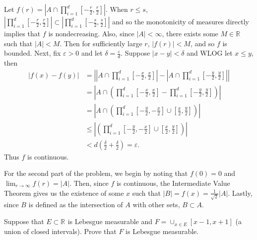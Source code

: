\begin{solution}
  Let $f(r) = \left| A \cap \prod_{i=1}^{d } [-\frac{r}{2}, \frac{r}{2}] \right|$.
  When $r\leq s$, $\left| \prod_{i=1}^{d } [-\frac{r}{2}, \frac{r}{2}] \right| \subset \left| \prod_{i=1}^{d } [-\frac{s}{2}, \frac{s}{2}] \right|$ and so the monotonicity of measures directly implies that $f$ is nondecreasing.
  Also, since $\left| A \right| < \infty$, there exists some $M \in \mathbb{R}^{}$ such that $\left| A \right| < M$.
  Then for sufficiently large $r$, $\left| f(r) \right| < M$, and so $f$ is bounded.
  Next, fix $\varepsilon > 0$ and let $\delta = \frac{\varepsilon}{d}$.
  Suppose $\left| x - y \right| < \delta$ and WLOG let $x \leq  y$, then
    \begin{align*}
      \left| f(x) - f(y) \right| &= \left| \left| A \cap \prod_{i=1}^{d } [-\frac{x}{2}, \frac{x}{2}] \right| - \left| A \cap \prod_{i=1}^{d } [-\frac{y}{2}, \frac{y}{2}] \right| \right| \\
                                 &= \left| A \cap \left( \prod_{i=1}^{d } [-\frac{x}{2}, \frac{x}{2}] - \prod_{i=1}^{d } [-\frac{y}{2}, \frac{y}{2}] \right) \right| \tag{Class Corollary}\\
                                 &= \left| A \cap \left( \prod_{i=1}^{d } [-\frac{y}{2}, -\frac{x}{2}] \cup  [\frac{x}{2}, \frac{y}{2}] \right) \right| \\
                                 &\leq \left| \left( \prod_{i=1}^{d } [-\frac{y}{2}, -\frac{x}{2}] \cup  [\frac{x}{2}, \frac{y}{2}] \right) \right| \tag{Monotonicity} \\
                                 &< d \left( \frac{\delta}{2} + \frac{\delta}{2} \right) = \varepsilon 
    .\end{align*}
  Thus $f$ is continuous.

  For the second part of the problem, we begin by noting that $f(0) = 0$ and \\$\lim_{r \to \infty}f(r) = \left| A \right| $.
  Then, since $f$ is continuous, the Intermediate Value Theorem gives us the existence of some $x$ such that $\left| B \right| = f(x) = \frac{1}{\sqrt{2} }\left| A \right|$.
  Lastly, since $B$ is defined as the intersection of $A$ with other sets, $B \subset A$.

  

\end{solution}

\pagebreak

\begin{problem}{4}
Suppose that $E \subset \mathbb{R}^{}$ is Lebesgue measurable and $F = \cup_{x \in E}^{} \left[ x-1,x+1 \right]$ (a union of closed intervals).
Prove that $F$ is Lebesgue measurable.
\end{problem}

